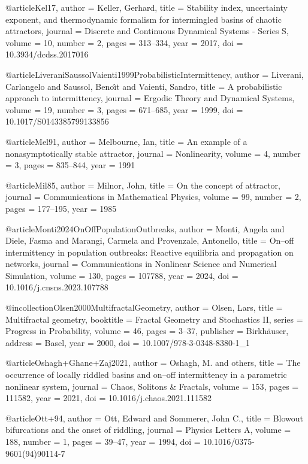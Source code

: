@article{Kel17,
  author  = {Keller, Gerhard},
  title   = {Stability index, uncertainty exponent, and thermodynamic formalism for intermingled basins of chaotic attractors},
  journal = {Discrete and Continuous Dynamical Systems - Series S},
  volume  = {10},
  number  = {2},
  pages   = {313--334},
  year    = {2017},
  doi     = {10.3934/dcdss.2017016}
}

@article{LiveraniSaussolVaienti1999ProbabilisticIntermittency,
  author  = {Liverani, Carlangelo and Saussol, Beno{\^\i}t and Vaienti, Sandro},
  title   = {A probabilistic approach to intermittency},
  journal = {Ergodic Theory and Dynamical Systems},
  volume  = {19},
  number  = {3},
  pages   = {671--685},
  year    = {1999},
  doi     = {10.1017/S0143385799133856}
}

@article{Mel91,
  author  = {Melbourne, Ian},
  title   = {An example of a nonasymptotically stable attractor},
  journal = {Nonlinearity},
  volume  = {4},
  number  = {3},
  pages   = {835--844},
  year    = {1991}
}

@article{Mil85,
  author  = {Milnor, John},
  title   = {On the concept of attractor},
  journal = {Communications in Mathematical Physics},
  volume  = {99},
  number  = {2},
  pages   = {177--195},
  year    = {1985}
}

@article{Monti2024OnOffPopulationOutbreaks,
  author  = {Monti, Angela and Diele, Fasma and Marangi, Carmela and Provenzale, Antonello},
  title   = {On--off intermittency in population outbreaks: Reactive equilibria and propagation on networks},
  journal = {Communications in Nonlinear Science and Numerical Simulation},
  volume  = {130},
  pages   = {107788},
  year    = {2024},
  doi     = {10.1016/j.cnsns.2023.107788}
}

@incollection{Olsen2000MultifractalGeometry,
  author    = {Olsen, Lars},
  title     = {Multifractal geometry},
  booktitle = {Fractal Geometry and Stochastics II},
  series    = {Progress in Probability},
  volume    = {46},
  pages     = {3--37},
  publisher = {Birkh{\"a}user},
  address   = {Basel},
  year      = {2000},
  doi       = {10.1007/978-3-0348-8380-1_1}
}

@article{Oshagh+Ghane+Zaj2021,
  author  = {Oshagh, M. and others},
  title   = {The occurrence of locally riddled basins and on--off intermittency in a parametric nonlinear system},
  journal = {Chaos, Solitons \& Fractals},
  volume  = {153},
  pages   = {111582},
  year    = {2021},
  doi     = {10.1016/j.chaos.2021.111582}
}

@article{Ott+94,
  author  = {Ott, Edward and Sommerer, John C.},
  title   = {Blowout bifurcations and the onset of riddling},
  journal = {Physics Letters A},
  volume  = {188},
  number  = {1},
  pages   = {39--47},
  year    = {1994},
  doi     = {10.1016/0375-9601(94)90114-7}
}

